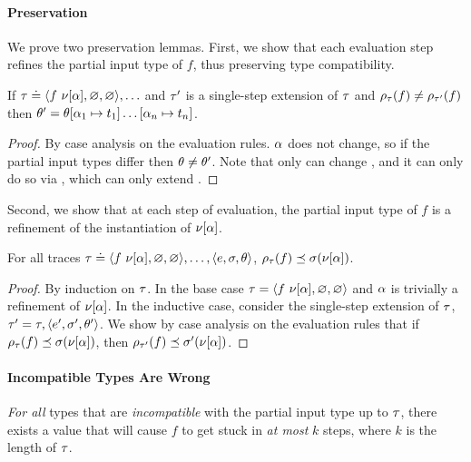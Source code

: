 
\paragraph{Preservation}
%
We prove two preservation lemmas. First, we show that each evaluation
step refines the partial input type of $f$, thus preserving type
compatibility.
%
\begin{lem}
\label{lem:vsu-ext}
If  $\tau \doteq \langle f\ \nu[\alpha], \varnothing, \varnothing \rangle,\ldots$
and $\tau'$ is a single-step extension of $\tau$
and $\rho_{\tau}(f) \neq \rho_{\tau'}(f)$
then $\theta' = \theta[\alpha_1 \mapsto t_1] \ldots [\alpha_n \mapsto t_n]$.
\end{lem}
\begin{proof}
  By case analysis on the evaluation rules.
  $\alpha$ does not change, so if the partial input types differ then
  $\theta \neq \theta'$.
  Note that only \forcesym can change \tsu, and it can only do so
  via \unifysym, which can only extend \tsu.
\end{proof}
%
Second, we show that at each step of evaluation, the partial input type of $f$
is a refinement of the instantiation of $\nu[\alpha]$.
%
\begin{lem}
\label{lem:resolve-compat}
For all traces
$\tau \doteq \langle f\ \nu[\alpha], \varnothing, \varnothing \rangle,\ldots,\langle e, \sigma, \theta \rangle$,
${\rho_{\tau}(f)} \preceq {\ensuremath{\sigma(\nu[\alpha])}}$.
\end{lem}
\begin{proof}
  By induction on $\tau$.
  In the base case $\tau = \langle f\ \nu[\alpha], \varnothing, \varnothing \rangle$
  and $\alpha$ is trivially a refinement of $\nu[\alpha]$.
  In the inductive case, consider the single-step extension of $\tau$,
  $\tau' = \tau,\langle e', \sigma', \theta' \rangle$.
  We show by case analysis on the evaluation rules that if
  ${\rho_{\tau}(f)} \preceq {\ensuremath{\sigma(\nu[\alpha])}}$, then
  ${\rho_{\tau'}(f)} \preceq {\ensuremath{\sigma'(\nu[\alpha])}}$.
\end{proof}

\paragraph{Incompatible Types Are Wrong}
\emph{For all} types that are \emph{incompatible} with the
partial input type up to $\tau$, there exists a value
that will cause $f$ to get stuck in \emph{at most} $k$ steps,
where $k$ is the length of $\tau$.

